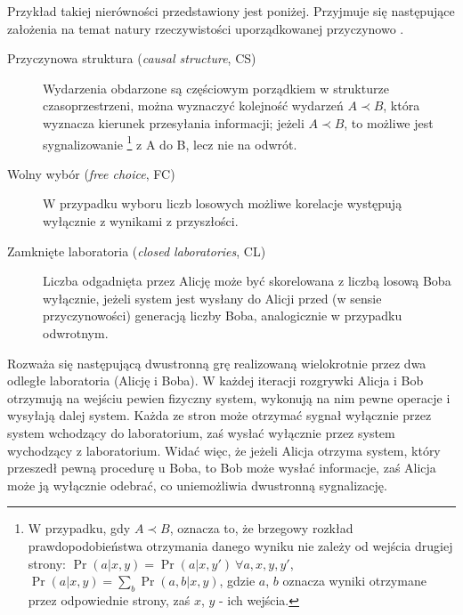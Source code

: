 \documentclass[10pt]{article} %
\begin{document}
Przykład takiej nierówności przedstawiony jest poniżej.
Przyjmuje się następujące założenia na temat natury rzeczywistości uporządkowanej przyczynowo \cite{process_matrix}.
\begin{description}
	\item[Przyczynowa struktura (\textit{causal structure}, CS)]
	Wydarzenia obdarzone są częściowym porządkiem w strukturze czasoprzestrzeni, można wyznaczyć kolejność wydarzeń $A \prec B$, która wyznacza kierunek przesyłania informacji; jeżeli $A \prec B$, to możliwe jest sygnalizowanie
	\footnote
	{W przypadku, gdy $A \prec B$, oznacza to, że brzegowy rozkład prawdopodobieństwa otrzymania danego wyniku nie zależy od wejścia drugiej strony: $\Pr(a|x, y) = \Pr(a|x, y')~\forall a,x,y,y'$, $\Pr(a|x,y) = \sum_b \Pr(a,b|x,y)$, gdzie $a$, $b$ oznacza wyniki otrzymane przez odpowiednie strony, zaś $x$, $y$ - ich wejścia.} 
	z A do B, lecz nie na odwrót.
	\item[Wolny wybór (\textit{free choice}, FC)]  
	W przypadku wyboru liczb losowych możliwe korelacje występują wyłącznie z wynikami z przyszłości.
	\item[Zamknięte laboratoria (\textit{closed laboratories}, CL)] 
	Liczba odgadnięta przez Alicję może być skorelowana z liczbą losową Boba wyłącznie, jeżeli system jest wysłany do Alicji przed (w sensie przyczynowości) generacją liczby Boba, analogicznie w przypadku odwrotnym.	
\end{description}
Rozważa się następującą dwustronną grę realizowaną wielokrotnie przez dwa odległe laboratoria (Alicję i Boba). W każdej iteracji rozgrywki Alicja i Bob otrzymują na wejściu pewien fizyczny system, wykonują na nim pewne operacje i wysyłają dalej system. Każda ze stron może otrzymać sygnał wyłącznie przez 
system wchodzący do laboratorium, zaś wysłać wyłącznie przez system wychodzący z laboratorium. Widać więc, że jeżeli Alicja otrzyma system, który przeszedł pewną procedurę u Boba, to Bob może wysłać informacje, zaś Alicja może ją wyłącznie odebrać, co uniemożliwia dwustronną sygnalizację.
\end{document}
